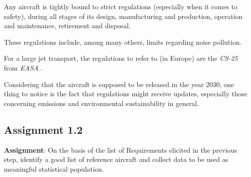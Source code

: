 \documentclass{article}
\begin{document}
Any aircraft is tightly bound to strict regulations (especially when it comes to safety), during all stages of its design, 
manufacturing and production, operation and maintenance, retirement and disposal.

These regulations include, among many others, limits regarding noise pollution.

For a large jet transport, the regulations to refer to (in Europe) are the \textit{CS-25} from \textit{EASA} \autocite{EASA_CS25}.

Considering that the aircraft is supposed to be released in the year 2030, one thing to notice
is the fact that regulations might receive updates, especially those concerning emissions and environmental sustainability in general.

\clearpage
\subsection{Assignment 1.2\label{Assignment_1.2}}
\textbf{Assignment}: On the basis of the list of Requirements elicited
in the previous step, identify a good list of reference aircraft and
collect data to be used as meaningful statistical population.\\ \\ \\ 
\end{document}
